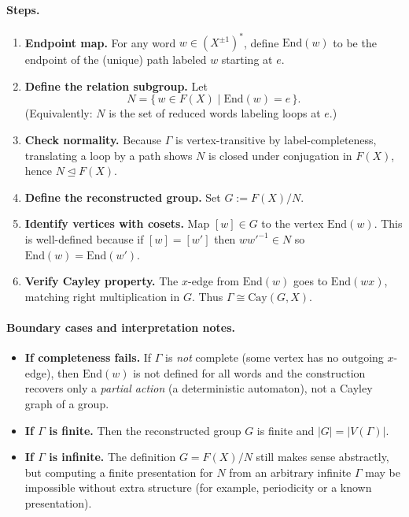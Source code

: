 \documentclass[11pt]{article}
\theoremstyle{definition}
\theoremstyle{plain}
\theoremstyle{remark}
\newcommand{\Cay}{\mathrm{Cay}}
\newcommand{\End}{\mathrm{End}}
\begin{document}
\paragraph{Steps.}
\begin{enumerate}[leftmargin=2.2em]
\item \textbf{Endpoint map.} For any word $w\in (X^{\pm1})^*$, define $\End(w)$ to be the endpoint of the (unique) path labeled $w$ starting at $e$.
\item \textbf{Define the relation subgroup.} Let
\[
N=\{\, w\in F(X)\mid \End(w)=e \,\}.
\]
(Equivalently: $N$ is the set of reduced words labeling loops at $e$.)
\item \textbf{Check normality.} Because $\Gamma$ is vertex-transitive by label-completeness, translating a loop by a path shows
$N$ is closed under conjugation in $F(X)$, hence $N\trianglelefteq F(X)$.
\item \textbf{Define the reconstructed group.} Set $G:=F(X)/N$.
\item \textbf{Identify vertices with cosets.} Map $[w]\in G$ to the vertex $\End(w)$.
This is well-defined because if $[w]=[w']$ then $ww'^{-1}\in N$ so $\End(w)=\End(w')$.
\item \textbf{Verify Cayley property.} The $x$-edge from $\End(w)$ goes to $\End(wx)$, matching right multiplication in $G$.
Thus $\Gamma\cong\Cay(G,X)$.
\end{enumerate}


\paragraph{Boundary cases and interpretation notes.}
\begin{itemize}[leftmargin=2em]
\item \textbf{If completeness fails.} If $\Gamma$ is \emph{not} complete (some vertex has no outgoing $x$-edge), then $\End(w)$ is not defined for all words and the construction recovers only a \emph{partial action} (a deterministic automaton), not a Cayley graph of a group.
\item \textbf{If $\Gamma$ is finite.} Then the reconstructed group $G$ is finite and $|G|=|V(\Gamma)|$.
\item \textbf{If $\Gamma$ is infinite.} The definition $G=F(X)/N$ still makes sense abstractly, but computing a finite presentation for $N$ from an arbitrary infinite $\Gamma$ may be impossible without extra structure (for example, periodicity or a known presentation).
\end{itemize}
\end{document}
